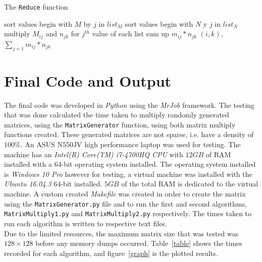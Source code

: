 \documentclass[10pt, conference]{IEEEtran}
\def\code#1{\texttt{#1}}
\begin{document}
\begin{algorithm}[h!]
\caption{The \code{Reduce} function~\cite{lendapp}}
\label{Reduce Algorithm}
\begin{algorithmic} 
	\STATE sort values begin with $M$ by $j$ in $list_M$
	\STATE sort values begin with $N$ y $j$ in $list_N$
	\STATE multiply $M_{ij}$ and $n_{jk}$ for $j^{th}$ value of each list
	\STATE sum up $m_{ij} * n_{jk}$
\ENDFOR
\RETURN $(i,k)$, $\sum_{j=1}^{}m_{ij} * n_{jk}$


\end{algorithmic}
\end{algorithm}


\section{Final Code and Output}
\label{Final Code and Output}
The final code was developed in \emph{Python} using the \emph{MrJob} framework. The testing that was done calculated the time taken to multiply randomly generated matrices, using the \code{MatrixGenerator} function, using both matrix multiply functions created. These generated matrices are not sparse, i.e. have a density of $100\%$. An ASUS N550JV high performance laptop was used for testing. The machine has an \emph{Intel(R) Core(TM) i7-4700HQ CPU} with $12GB$ of RAM installed with a 64-bit operating system installed. The operating system installed is \emph{Windows 10 Pro} however for testing, a virtual machine was installed with the \emph{Ubuntu 16.04.3} 64-bit installed. $5GB$ of the total RAM is dedicated to the virtual machine. A custom created \emph{Makefile} was created in order to create the matrix using the \code{MatrixGenerator.py} file and to run the first and second algorithms, \code{MatrixMultiply1.py} and \code{MatrixMultiply2.py} respectively. The times taken to run each algorithm is written to respective text files.\\

Due to the limited resources, the maximum matrix size that was tested was $128 \times 128$ before any memory dumps occurred. Table~\ref{table} shows  the times recorded for each algorithm, and figure~\ref{graph} is the plotted results.
\end{document}
